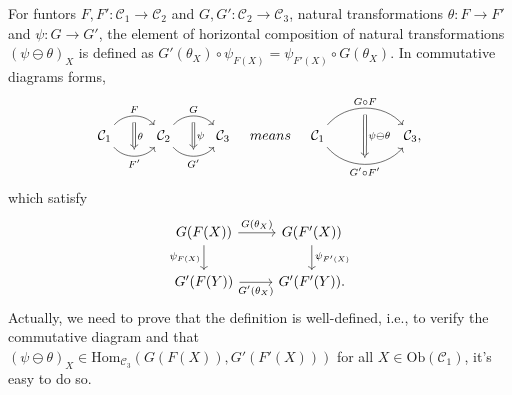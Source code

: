 \documentclass{article}
\begin{document}
\begin{defi}\label{horizontal composition}
	For funtors $F,F':\mathcal{C}_1\to\mathcal{C}_2$ and $G,G':\mathcal{C}_2\to\mathcal{C}_3$, natural transformations $\theta:F\to F'$ and $\psi:G\to G'$, the element of {\rm horizontal composition} of natural transformations $(\psi\ominus\theta)_X$ is defined as $G'(\theta_X)\circ\psi_{F(X)}=\psi_{F'(X)}\circ G(\theta_X)$. In commutative diagrams forms,
	\[\begin{tikzcd}
			\mathcal{C}_1 \arrow[bend left=50, r, "F", ""' name=F] \arrow[bend right=50, r, "F'"', "" name=F'] &
			\mathcal{C}_2 \arrow[bend left=50, r, "G", ""' name=G] \arrow[bend right=50, r, "G'"', "" name=G'] &
			\arrow[Rightarrow, from=F, to=F', "\theta"] \arrow[Rightarrow, from=G, to=G', "\psi"]\mathcal{C}_3
		\end{tikzcd}\quad{means}\quad\begin{tikzcd}
			\mathcal{C}_1
			\arrow[bend left=50, rr, "G\circ F", ""' name=A]
			\arrow[bend right=50, rr, "G'\circ F'"', "" name=B] & & 
			\arrow[Rightarrow, from=A, to=B, "\psi\ominus\theta"]\mathcal{C}_3,
	\end{tikzcd}\]
	which satisfy
	\begin{equation}\begin{tikzcd}
		G(F(X)) \arrow[r,"G(\theta_X)"] \arrow[d,"\psi_{F(X)}"'] & G(F'(X)) \arrow[d,"\psi_{F'(X)}"] \\
		G'(F(Y)) \arrow[r,"G'(\theta_X)"'] & G'(F'(Y)).
	\end{tikzcd}\end{equation}
	Actually, we need to prove that the definition is well-defined, i.e., to verify the commutative diagram and that $(\psi\ominus\theta)_X\in\mathrm{Hom}_{\mathcal{C}_3}(G(F(X)),G'(F'(X)))$ for all $X\in\mathrm{Ob}(\mathcal{C}_1)$, it's easy to do so.
\end{defi}
\end{document}

